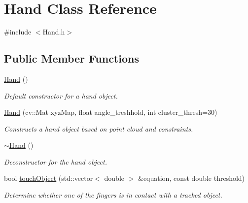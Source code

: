 \hypertarget{class_hand}{}\section{Hand Class Reference}
\label{class_hand}


{\ttfamily \#include $<$Hand.\+h$>$}

\subsection*{Public Member Functions}
\begin{DoxyCompactItemize}
\item 
\hyperlink{class_hand_aa733faf150351c640fc7d1bf460b07e9}{Hand} ()
\begin{DoxyCompactList}\small\item\em Default constructor for a hand object. \end{DoxyCompactList}\item 
\hyperlink{class_hand_abc73f91de5c25f023c7411fb353f8509}{Hand} (cv\+::\+Mat xyz\+Map, float angle\+\_\+treshhold, int cluster\+\_\+thresh=30)
\begin{DoxyCompactList}\small\item\em Constructs a hand object based on point cloud and constraints. \end{DoxyCompactList}\item 
\hyperlink{class_hand_a7ff29a6f23f98c5e57f44d23a76912be}{$\sim$\+Hand} ()
\begin{DoxyCompactList}\small\item\em Deconstructor for the hand object. \end{DoxyCompactList}\item 
bool \hyperlink{class_hand_aad89c3e47921cb0c39430f4501238088}{touch\+Object} (std\+::vector$<$ double $>$ \&equation, const double threshold)
\begin{DoxyCompactList}\small\item\em Determine whether one of the fingers is in contact with a tracked object. \end{DoxyCompactList}\end{DoxyCompactItemize}
